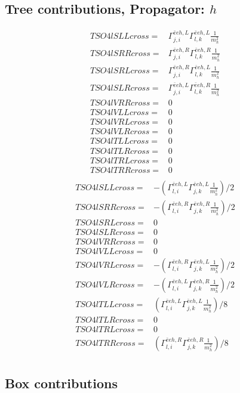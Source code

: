 \documentclass[A4,landscape]{article}
\begin{document}
\subsection{Tree contributions, Propagator: $h$} 

\begin{align} 
  TSO4lSLLcross= & \Gamma^{\bar{e}e h ,L}_{j, i} \Gamma^{\bar{e}e h ,L}_{l, k} \frac{1}{m^2_{h}} \\ 
  TSO4lSRRcross= & \Gamma^{\bar{e}e h ,R}_{j, i} \Gamma^{\bar{e}e h ,R}_{l, k} \frac{1}{m^2_{h}} \\ 
  TSO4lSRLcross= & \Gamma^{\bar{e}e h ,R}_{j, i} \Gamma^{\bar{e}e h ,L}_{l, k} \frac{1}{m^2_{h}} \\ 
  TSO4lSLRcross= & \Gamma^{\bar{e}e h ,L}_{j, i} \Gamma^{\bar{e}e h ,R}_{l, k} \frac{1}{m^2_{h}} \\ 
  TSO4lVRRcross= & 0 \\ 
  TSO4lVLLcross= & 0 \\ 
  TSO4lVRLcross= & 0 \\ 
  TSO4lVLRcross= & 0 \\ 
  TSO4lTLLcross= & 0 \\ 
  TSO4lTLRcross= & 0 \\ 
  TSO4lTRLcross= & 0 \\ 
  TSO4lTRRcross= & 0 \\ 
\end{align} 
\begin{align} 
  TSO4lSLLcross= & -(\Gamma^{\bar{e}e h ,L}_{l, i} \Gamma^{\bar{e}e h ,L}_{j, k} \frac{1}{m^2_{h}})/2 \\ 
  TSO4lSRRcross= & -(\Gamma^{\bar{e}e h ,R}_{l, i} \Gamma^{\bar{e}e h ,R}_{j, k} \frac{1}{m^2_{h}})/2 \\ 
  TSO4lSRLcross= & 0 \\ 
  TSO4lSLRcross= & 0 \\ 
  TSO4lVRRcross= & 0 \\ 
  TSO4lVLLcross= & 0 \\ 
  TSO4lVRLcross= & -(\Gamma^{\bar{e}e h ,R}_{l, i} \Gamma^{\bar{e}e h ,L}_{j, k} \frac{1}{m^2_{h}})/2 \\ 
  TSO4lVLRcross= & -(\Gamma^{\bar{e}e h ,L}_{l, i} \Gamma^{\bar{e}e h ,R}_{j, k} \frac{1}{m^2_{h}})/2 \\ 
  TSO4lTLLcross= & (\Gamma^{\bar{e}e h ,L}_{l, i} \Gamma^{\bar{e}e h ,L}_{j, k} \frac{1}{m^2_{h}})/8 \\ 
  TSO4lTLRcross= & 0 \\ 
  TSO4lTRLcross= & 0 \\ 
  TSO4lTRRcross= & (\Gamma^{\bar{e}e h ,R}_{l, i} \Gamma^{\bar{e}e h ,R}_{j, k} \frac{1}{m^2_{h}})/8 \\ 
\end{align} 
\subsection{Box contributions} 
\end{document}
